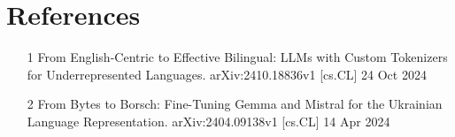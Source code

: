 \documentclass[12pt,a4]{article}
\begin{document}
  \section{References}
    \label{submission}
    \begin{itemize}
        \item[1] From English-Centric to Effective Bilingual: LLMs with Custom Tokenizers for Underrepresented Languages. arXiv:2410.18836v1 [cs.CL] 24 Oct 2024
        \item[2] From Bytes to Borsch: Fine-Tuning Gemma and Mistral for the Ukrainian Language Representation. arXiv:2404.09138v1 [cs.CL] 14 Apr 2024
    \end{itemize}


    
    
    

\end{document}
